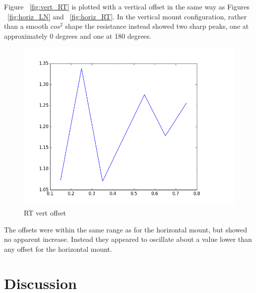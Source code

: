 \documentclass[10pt, twocolumn]{revtex4}
\begin{document}
Figure ~\ref{fig:vert_RT} is plotted with a vertical offset in the same way as Figures ~\ref{fig:horiz_LN} and ~\ref{fig:horiz_RT}. In the vertical mount configuration, rather than a smooth $cos^2$ shape the resistance instead showed two sharp peaks, one at approximately 0 degrees and one at 180 degrees. 

\begin{figure}[H]
	\centering
	\includegraphics[width = \columnwidth]{Vert_RT_offsets.png}
	\caption{RT vert offset}
	\label{fig:vert_RT_offsets}
\end{figure}

The offsets were within the same range as for the horizontal mount, but showed no apparent increase. Instead they appeared to oscillate about a value lower than any offset for the horizontal mount. %


\section{Discussion}
\end{document}
